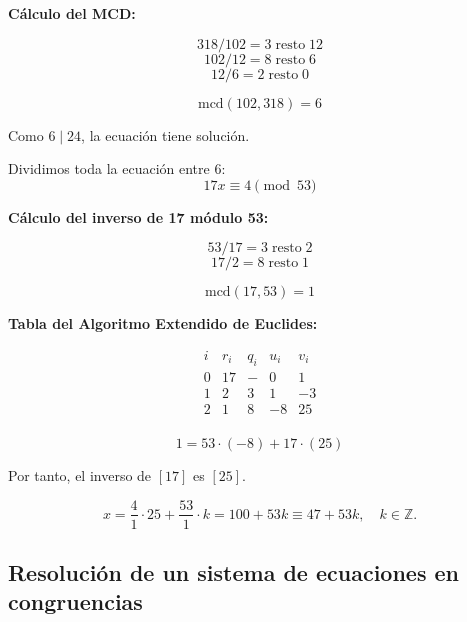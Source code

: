 \documentclass[a4paper,12pt]{article}
\begin{document}
\begin{ejemplo}[title={Ejemplo 1: Ecuación \(102x \equiv 24 \pmod{318}\)}]

\textbf{Cálculo del MCD:}

\[
318 / 102 = 3 \;\text{resto}\; 12
\]
\[
102 / 12 = 8 \;\text{resto}\; \boxed{6}
\]
\[
12 / 6 = 2 \;\text{resto}\; 0
\]

\[
\text{mcd}(102, 318) = \boxed{6}
\]

Como \(6 \mid 24\), la ecuación tiene solución.

Dividimos toda la ecuación entre 6:
\[
17x \equiv 4 \pmod{53}
\]

\textbf{Cálculo del inverso de 17 módulo 53:}

\[
53 / 17 = 3 \;\text{resto}\; 2
\]
\[
17 / 2 = 8 \;\text{resto}\; \boxed{1}
\]

\[
\text{mcd}(17,53) = \boxed{1}
\]

\textbf{Tabla del Algoritmo Extendido de Euclides:}

\[
\begin{array}{c|c|c|c|c}
i & r_i & q_i & u_i & v_i \\
\hline
0 & 17 & - & 0 & 1 \\
1 & 2 & 3 & 1 & -3 \\
2 & \boxed{1} & 8 & -8 & 25 \\
\end{array}
\]

\[
\boxed{1} = 53 \cdot (-8) + 17 \cdot (25)
\]

Por tanto, el inverso de \([17]\) es \([25]\).

\[
x = \frac{4}{1} \cdot 25 + \frac{53}{1} \cdot k = 100 + 53k \equiv 47 + 53k, \quad k \in \mathbb{Z}.
\]
\end{ejemplo}

\subsection{Resolución de un sistema de ecuaciones en congruencias}
\end{document}
